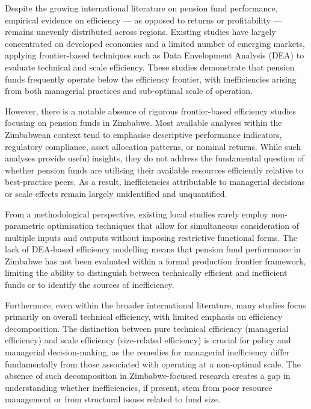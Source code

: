 \documentclass[12pt,a4paper]{article}
\begin{document}
Despite the growing international literature on pension fund performance, empirical evidence on efficiency --- as opposed to returns or profitability --- remains unevenly distributed across regions. Existing studies have largely concentrated on developed economies and a limited number of emerging markets, applying frontier-based techniques such as Data Envelopment Analysis (DEA) to evaluate technical and scale efficiency. These studies demonstrate that pension funds frequently operate below the efficiency frontier, with inefficiencies arising from both managerial practices and sub-optimal scale of operation.

However, there is a notable absence of rigorous frontier-based efficiency studies focusing on pension funds in Zimbabwe. Most available analyses within the Zimbabwean context tend to emphasise descriptive performance indicators, regulatory compliance, asset allocation patterns, or nominal returns. While such analyses provide useful insights, they do not address the fundamental question of whether pension funds are utilising their available resources efficiently relative to best-practice peers. As a result, inefficiencies attributable to managerial decisions or scale effects remain largely unidentified and unquantified.

From a methodological perspective, existing local studies rarely employ non-parametric optimisation techniques that allow for simultaneous consideration of multiple inputs and outputs without imposing restrictive functional forms. The lack of DEA-based efficiency modelling means that pension fund performance in Zimbabwe has not been evaluated within a formal production frontier framework, limiting the ability to distinguish between technically efficient and inefficient funds or to identify the sources of inefficiency.

Furthermore, even within the broader international literature, many studies focus primarily on overall technical efficiency, with limited emphasis on efficiency decomposition. The distinction between pure technical efficiency (managerial efficiency) and scale efficiency (size-related efficiency) is crucial for policy and managerial decision-making, as the remedies for managerial inefficiency differ fundamentally from those associated with operating at a non-optimal scale. The absence of such decomposition in Zimbabwe-focused research creates a gap in understanding whether inefficiencies, if present, stem from poor resource management or from structural issues related to fund size.
\end{document}
